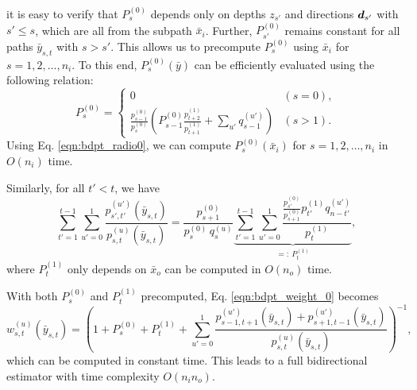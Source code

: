 it is easy to verify that $P^{(0)}_s$ depends only on depths $z_{s'}$ and directions $\bm{d}_{s'}$ with $s' \leq s$, which are all from the subpath $\bar{x}_i$.
Further, $P^{(0)}_{s'}$ remains constant for all paths $\bar{y}_{s,t}$ with $s > s'$.
This allows us to precompute $P^{(0)}_s$ using $\bar{x}_i$ for $s = 1, 2, \ldots, n_i$.
To this end, $P^{(0)}_s(\bar{y})$ can be efficiently evaluated using the following relation:
\begin{equation}
\label{eqn:bdpt_radio0}
P^{(0)}_s = \begin{cases}
0 & (s = 0),\\
\frac{p^{(0)}_{s - 1}}{p^{(0)}_s} \left( P^{(0)}_{s - 1} \frac{p^{(1)}_{t + 2}}{p^{(1)}_{t + 1}} + \sum_{u'} q^{(u')}_{s - 1} \right) & (s > 1).
\end{cases}
\end{equation}
Using Eq. \eqref{eqn:bdpt_radio0}, we can compute $P^{(0)}_s(\bar{x}_i)$ for $s = 1, 2, \ldots, n_i$ in $O(n_i)$ time.

Similarly, for all $t' < t$, we have
\begin{equation}
\label{eqn:bdpt_pdf_ratio_2}
\sum_{t' = 1}^{t - 1} \sum_{u' = 0}^1 \frac{p^{(u')}_{s', t'}(\bar{y}_{s,t})}{p^{(u)}_{s,t}(\bar{y}_{s,t})}
= \frac{p^{(0)}_{s + 1}}{p^{(0)}_s \, q^{(u)}_s}
\underbrace{\sum_{t' = 1}^{t - 1} \sum_{u' = 0}^1 \frac{\frac{p^{(0)}_{s'}}{p^{(0)}_{s + 1}} p^{(1)}_{t'} q^{(u')}_{n - t'}}{p^{(1)}_t}}_{=:\ P^{(1)}_t},
\end{equation}
where $P^{(1)}_t$ only depends on $\bar{x}_o$ can be computed in $O(n_o)$ time.

With both $P^{(0)}_s$ and $P^{(1)}_t$ precomputed, Eq. \eqref{eqn:bdpt_weight_0} becomes
\begin{equation}
\label{eqn:bdpt_weight_1}
w^{(u)}_{s, t}(\bar{y}_{s,t})
= \left(1 + P^{(0)}_s + P^{(1)}_t +
\sum_{u'=0}^1 \frac{p^{(u')}_{s - 1, t + 1}(\bar{y}_{s,t}) + p^{(u')}_{s + 1, t - 1}(\bar{y}_{s,t})}{p^{(u)}_{s,t}(\bar{y}_{s,t})}\right)^{-1},
\end{equation}
which can be computed in constant time.
This leads to a full bidirectional estimator with time complexity $O(n_i n_o)$.
